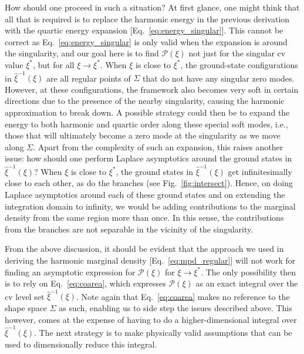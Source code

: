 How should one proceed in such a situation?
At first glance, one might think that all that is required is to replace the harmonic energy in the previous derivation with the quartic energy expansion [Eq.~\eqref{eq:energy_singular}].
This cannot be correct as Eq.~\eqref{eq:energy_singular} is only valid when the expansion is around the singularity, and our goal here is to find $\mathscr{P}(\xi)$ not just for the singular \ac{cv} value $\xi^{*}$, but for all $\xi \to \xi^{*}$.
When $\xi$ is close to $\xi^{*}$, the ground-state configurations in $\hat{\xi}^{-1}(\xi)$ are all regular points of $\Sigma$ that do not have any singular zero modes.
However, at these configurations, the framework also becomes very soft in certain directions due to the presence of the nearby singularity, causing the harmonic approximation to break down.
A possible strategy could then be to expand the energy to both harmonic and quartic order along these special soft modes, i.e., those that will ultimately become a zero mode at the singularity as we move along $\Sigma$.
Apart from the complexity of such an expansion, this raises another issue: how should one perform Laplace asymptotics around the ground states in $\hat{\xi}^{-1}(\xi)$?
When $\xi$ is close to $\xi^{*}$, the ground states in $\hat{\xi}^{-1}(\xi)$ get infinitesimally close to each other, as do the branches (see Fig.~\ref{fig:intersect}).
Hence, on doing Laplace asymptotics around each of these ground states and on extending the integration domain to infinity, we would be adding contributions to the marginal density from the same region more than once.
In this sense, the contributions from the branches are not separable in the vicinity of the singularity.

From the above discussion, it should be evident that the approach we used in deriving the harmonic marginal density [Eq.~\eqref{eq:mpd_regular}] will not work for finding an asymptotic expression for $\mathscr{P}(\xi)$ for $\xi \to \xi^{*}$.
The only possibility then is to rely on Eq.~\eqref{eq:coarea}, which expresses $\mathscr{P}(\xi)$ as an exact integral over the \ac{cv} level set $\hat{\xi}^{-1}(\xi)$.
Note again that Eq.~\eqref{eq:coarea} makes no reference to the shape space $\Sigma$ as such, enabling us to side step the issues described above.
This however, comes at the expense of having to do a higher-dimensional integral over $\hat{\xi}^{-1}(\xi)$.
The next strategy is to make physically valid assumptions that can be used to dimensionally reduce this integral.

